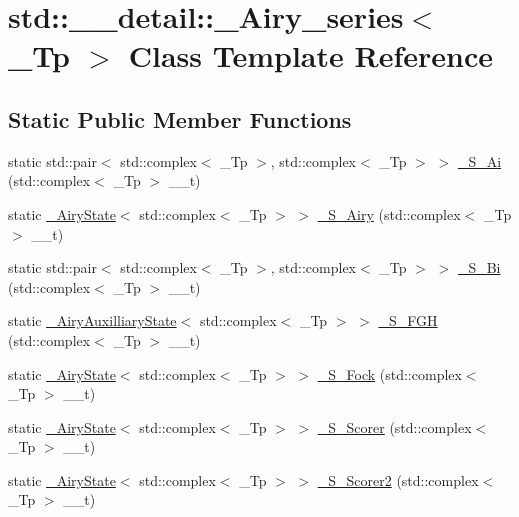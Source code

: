 \hypertarget{classstd_1_1____detail_1_1__Airy__series}{}\section{std\+:\+:\+\_\+\+\_\+detail\+:\+:\+\_\+\+Airy\+\_\+series$<$ \+\_\+\+Tp $>$ Class Template Reference}
\label{classstd_1_1____detail_1_1__Airy__series}
\subsection*{Static Public Member Functions}
\begin{DoxyCompactItemize}
\item 
static std\+::pair$<$ std\+::complex$<$ \+\_\+\+Tp $>$, std\+::complex$<$ \+\_\+\+Tp $>$ $>$ \hyperlink{classstd_1_1____detail_1_1__Airy__series_a6920ff39e7284ef5e3bf80fe9787908d}{\+\_\+\+S\+\_\+\+Ai} (std\+::complex$<$ \+\_\+\+Tp $>$ \+\_\+\+\_\+t)
\item 
static \hyperlink{structstd_1_1____detail_1_1__AiryState}{\+\_\+\+Airy\+State}$<$ std\+::complex$<$ \+\_\+\+Tp $>$ $>$ \hyperlink{classstd_1_1____detail_1_1__Airy__series_a996f5275a542f14649a6c022356344a7}{\+\_\+\+S\+\_\+\+Airy} (std\+::complex$<$ \+\_\+\+Tp $>$ \+\_\+\+\_\+t)
\item 
static std\+::pair$<$ std\+::complex$<$ \+\_\+\+Tp $>$, std\+::complex$<$ \+\_\+\+Tp $>$ $>$ \hyperlink{classstd_1_1____detail_1_1__Airy__series_a98aa07fca8b6644e25b432b8aa3f48bc}{\+\_\+\+S\+\_\+\+Bi} (std\+::complex$<$ \+\_\+\+Tp $>$ \+\_\+\+\_\+t)
\item 
static \hyperlink{structstd_1_1____detail_1_1__AiryAuxilliaryState}{\+\_\+\+Airy\+Auxilliary\+State}$<$ std\+::complex$<$ \+\_\+\+Tp $>$ $>$ \hyperlink{classstd_1_1____detail_1_1__Airy__series_a9a32ed90d9921b0f8425a9fb10e380a9}{\+\_\+\+S\+\_\+\+F\+GH} (std\+::complex$<$ \+\_\+\+Tp $>$ \+\_\+\+\_\+t)
\item 
static \hyperlink{structstd_1_1____detail_1_1__AiryState}{\+\_\+\+Airy\+State}$<$ std\+::complex$<$ \+\_\+\+Tp $>$ $>$ \hyperlink{classstd_1_1____detail_1_1__Airy__series_a673f93188dacd289d89af3df30476679}{\+\_\+\+S\+\_\+\+Fock} (std\+::complex$<$ \+\_\+\+Tp $>$ \+\_\+\+\_\+t)
\item 
static \hyperlink{structstd_1_1____detail_1_1__AiryState}{\+\_\+\+Airy\+State}$<$ std\+::complex$<$ \+\_\+\+Tp $>$ $>$ \hyperlink{classstd_1_1____detail_1_1__Airy__series_a7d6250d9854644966a349669ddf2d929}{\+\_\+\+S\+\_\+\+Scorer} (std\+::complex$<$ \+\_\+\+Tp $>$ \+\_\+\+\_\+t)
\item 
static \hyperlink{structstd_1_1____detail_1_1__AiryState}{\+\_\+\+Airy\+State}$<$ std\+::complex$<$ \+\_\+\+Tp $>$ $>$ \hyperlink{classstd_1_1____detail_1_1__Airy__series_ad8de959f8f98da445946c35149fc933e}{\+\_\+\+S\+\_\+\+Scorer2} (std\+::complex$<$ \+\_\+\+Tp $>$ \+\_\+\+\_\+t)
\end{DoxyCompactItemize}

